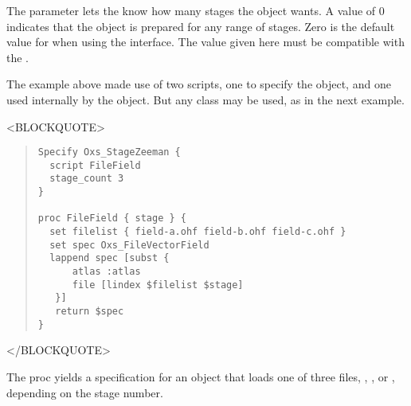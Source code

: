 \begin{itemize}
\begin{description}
   The  parameter lets the
    know how many stages the
    object wants.  A value of 0 indicates that the
   object is prepared for any range of stages.  Zero is the default
   value for  when using the 
   interface.  The  value given here must be compatible
   with the .

   The example above made use of two scripts, one to specify the
    object, and one used internally by the
    object.  But any 
   class may be used, as in the next example.
\begin{rawhtml}<BLOCKQUOTE>\end{rawhtml}
\begin{quote}
\begin{verbatim}
Specify Oxs_StageZeeman {
  script FileField
  stage_count 3
}

proc FileField { stage } {
  set filelist { field-a.ohf field-b.ohf field-c.ohf }
  set spec Oxs_FileVectorField
  lappend spec [subst {
      atlas :atlas
      file [lindex $filelist $stage]
   }]
   return $spec
}
\end{verbatim}
\end{quote}
\begin{rawhtml}</BLOCKQUOTE>\end{rawhtml}
   The  proc yields a specification for an
    object that loads one of three files,
   , , or , depending on
   the stage number.


\end{description}
\end{itemize}
